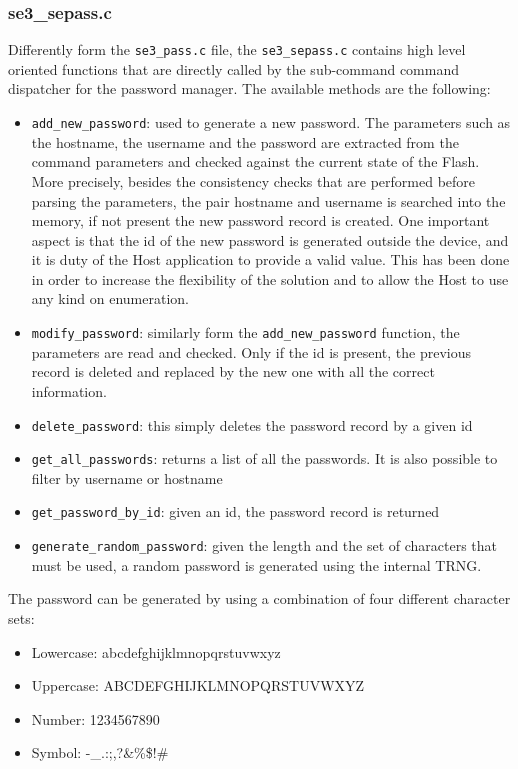 \subsubsection{se3\_sepass.c}
\label{sec:se3_sepass.c}
Differently form the \texttt{se3\_pass.c} file, the \texttt{se3\_sepass.c} contains high level oriented functions that are directly called by the sub-command command dispatcher for the password manager.\newline\newline
The available methods are the following:
\begin{itemize}
	\item \texttt{add\_new\_password}: used to generate a new password. The parameters such as the hostname, the username and the password are extracted from the command parameters and checked against the current state of the Flash. More precisely, besides the consistency checks that are performed before parsing the parameters, the pair hostname and username is searched into the memory, if not present the new password record is created. One important aspect is that the id of the new password is generated outside the device, and it is duty of the Host application to provide a valid value. This has been done in order to increase the flexibility of the solution and to allow the Host to use any kind on enumeration.
	\item \texttt{modify\_password}: similarly form the \texttt{add\_new\_password} function, the parameters are read and checked. Only if the id is present, the previous record is deleted and replaced by the new one with all the correct information.
	\item \texttt{delete\_password}: this simply deletes the password record by a given id
	\item \texttt{get\_all\_passwords}: returns a list of all the passwords. It is also possible to filter by username or hostname
	\item \texttt{get\_password\_by\_id}: given an id, the password record is returned
	\item \texttt{generate\_random\_password}: given the length and the set of characters that must be used, a random password is generated using the internal TRNG.
\end{itemize}

The password can be generated by using a combination of four different character sets:
\begin{itemize}
	\item Lowercase: abcdefghijklmnopqrstuvwxyz
	\item Uppercase: ABCDEFGHIJKLMNOPQRSTUVWXYZ
	\item Number: 1234567890
	\item Symbol: -\_.:;,?\&\%\$!\@\#
\end{itemize}

